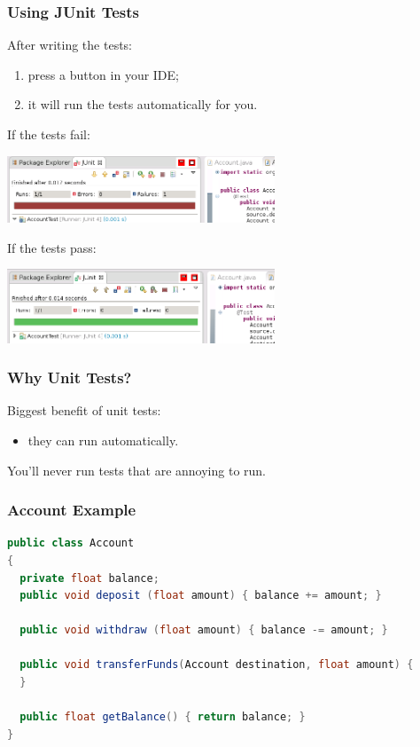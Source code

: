 \begin{frame}
\frametitle{Using JUnit Tests}

\begin{changemargin}{1cm}

After writing the tests:
\begin{enumerate}
\item press a button in your IDE;
\item it will run the tests automatically for you.
\end{enumerate}
\end{changemargin}

If the tests fail:

\begin{center}
\includegraphics[width=0.6\textwidth]{images/fail.png}
\end{center}

If the tests pass:

\begin{center}
\includegraphics[width=0.6\textwidth]{images/pass.png}
\end{center}

\end{frame}

\begin{frame}
\frametitle{Why Unit Tests?}

\begin{changemargin}{1cm}
Biggest benefit of unit tests:
\begin{itemize}
\item they can run automatically.
\end{itemize}
You'll never run tests that are annoying to run.

\end{changemargin}
\end{frame}


\begin{frame}[fragile]
\frametitle{Account Example}

\begin{lstlisting}[language={Java},basicstyle=\scriptsize]
public class Account
{
  private float balance;
  public void deposit (float amount) { balance += amount; }

  public void withdraw (float amount) { balance -= amount; }

  public void transferFunds(Account destination, float amount) {
  }

  public float getBalance() { return balance; }
}
\end{lstlisting}

\end{frame}

